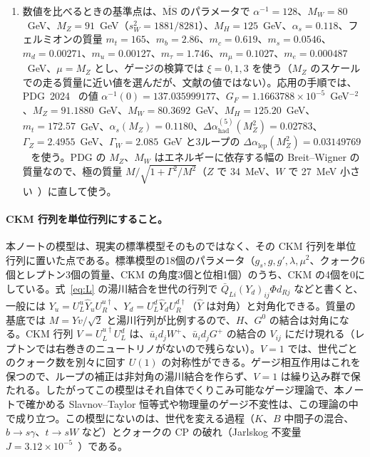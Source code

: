 \documentclass[a4paper,10pt]{ltjsarticle}
\newcommand{\MSbar}{\overline{\mathrm{MS}}}
\newcommand{\sw}{s_W}
\begin{document}
\begin{enumerate}
\item 数値を比べるときの基準点は、$\MSbar$ のパラメータで $\alpha^{-1}=128$、$M_W=80$~GeV、$M_Z=91$~GeV（$\sw^2=1881/8281$）、$M_H=125$~GeV、$\alpha_s=0.118$、フェルミオンの質量 $m_t=165$、$m_b=2.86$、$m_c=0.619$、$m_s=0.0546$、$m_d=0.00271$、$m_u=0.00127$、$m_\tau=1.746$、$m_\mu=0.1027$、$m_e=0.000487$~GeV、$\mu=M_Z$ とし、ゲージの検算では $\xi=0,1,3$ を使う（$M_Z$ のスケールでの走る質量に近い値を選んだが、文献の値ではない）。応用の手順では、PDG~2024~\cite{pdg24} の値 $\alpha^{-1}(0)=137.035999177$、$G_F=1.1663788\times10^{-5}$~GeV$^{-2}$、$M_Z=91.1880$~GeV、$M_W=80.3692$~GeV、$M_H=125.20$~GeV、$m_t=172.57$~GeV、$\alpha_s(M_Z)=0.1180$、$\Delta\alpha^{(5)}_{\mathrm{had}}(M_Z^2)=0.02783$、$\Gamma_Z=2.4955$~GeV、$\Gamma_W=2.085$~GeV と3ループの $\Delta\alpha_{\mathrm{lep}}(M_Z^2)=0.03149769$~\cite{steinhauser98} を使う。PDG の $M_Z$、$M_W$ はエネルギーに依存する幅の Breit--Wigner の質量なので、極の質量 $M/\sqrt{1+\Gamma^2/M^2}$（$Z$ で 34~MeV、$W$ で 27~MeV 小さい~\cite{mr19}）に直して使う。
\end{enumerate}

\paragraph{CKM 行列を単位行列にすること。}本ノートの模型は、現実の標準模型そのものではなく、その CKM 行列を単位行列に置いた点である。標準模型の18個のパラメータ（$g_s,g,g',\lambda,\mu^2$、クォーク6個とレプトン3個の質量、CKM の角度3個と位相1個）のうち、CKM の4個を0にしている。式~\eqref{eq:L} の湯川結合を世代の行列で $\bar Q_{Li}(Y_d)_{ij}\Phi d_{Rj}$ などと書くと、一般には $Y_u=U^u_L\hat Y_uU^{u\dagger}_R$、$Y_d=U^d_L\hat Y_dU^{d\dagger}_R$（$\hat Y$ は対角）と対角化できる。質量の基底では $M=Yv/\sqrt2$ と湯川行列が比例するので、$H$、$G^0$ の結合は対角になる。CKM 行列 $V=U^{u\dagger}_LU^d_L$ は、$\bar u_id_jW^+$、$\bar u_id_jG^+$ の結合の $V_{ij}$ にだけ現れる（レプトンでは右巻きのニュートリノがないので残らない）。$V=1$ では、世代ごとのクォーク数を別々に回す $U(1)$ の対称性ができる。ゲージ相互作用はこれを保つので、ループの補正は非対角の湯川結合を作らず、$V=1$ は繰り込み群で保たれる。したがってこの模型はそれ自体でくりこみ可能なゲージ理論で、本ノートで確かめる Slavnov--Taylor 恒等式や物理量のゲージ不変性は、この理論の中で成り立つ。この模型にないのは、世代を変える過程（$K$、$B$ 中間子の混合、$b\to s\gamma$、$t\to sW$ など）とクォークの CP の破れ（Jarlskog 不変量 $J=3.12\times10^{-5}$~\cite{pdg24}）である。
\end{document}
